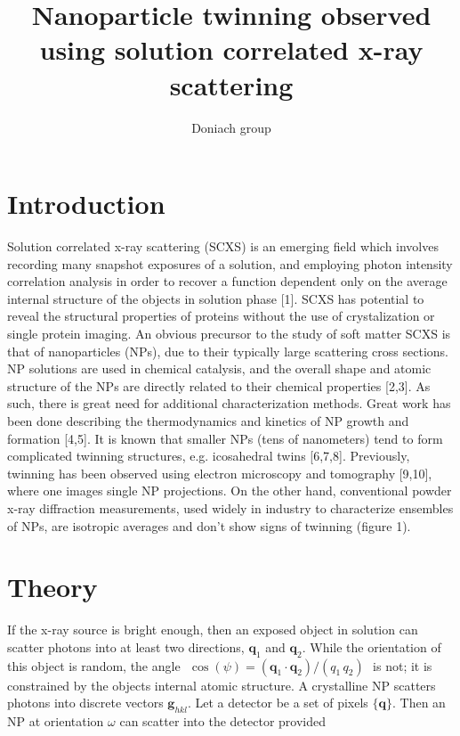 \documentclass [11pt,fleqn]{article}
\title{Nanoparticle twinning observed using solution correlated x-ray scattering}
\author{Doniach group}
\date{}
\begin{document}
 
\maketitle

\delimitershortfall=-1pt




\section{Introduction}

Solution correlated x-ray scattering (SCXS) is an emerging field which involves recording many snapshot exposures of a solution, and employing photon intensity correlation analysis in order to recover a function dependent only on the average internal structure of the objects in solution phase [1]. SCXS has potential to reveal the structural properties of proteins without the use of crystalization or single protein imaging. An obvious precursor to the study of soft matter SCXS is that of nanoparticles (NPs), due to their typically large scattering cross sections. NP solutions are used in chemical catalysis, and the overall shape and atomic structure of the NPs are directly related to their chemical properties [2,3]. As such, there is great need for additional characterization methods. Great work has been done describing the thermodynamics and kinetics of NP growth and formation [4,5]. It is known that smaller NPs (tens of nanometers) tend to form complicated twinning structures, e.g. icosahedral twins [6,7,8]. Previously, twinning has been observed using electron microscopy and tomography [9,10], where one images single NP projections. On the other hand, conventional powder x-ray diffraction measurements, used widely in industry to characterize ensembles of NPs, are isotropic averages and don't show signs of twinning (figure 1).
 
\section{Theory}
If the x-ray source is bright enough, then an exposed object in solution can scatter photons into at least two directions, $\bm q_1$ and $\bm q_2$. While the orientation of this object is random, the angle $\,\, \cos (\psi) = (\bm q_1 \cdot \bm q_2)/(q_1 \, q_2 )\,\,$ is not; it is constrained by the objects internal atomic structure. A crystalline NP scatters photons into discrete vectors $\bm g_{hkl}$. Let a detector be a set of pixels $\{\bm q\}$. Then an NP at orientation $\omega$ can scatter into the detector provided 
\end{document}
